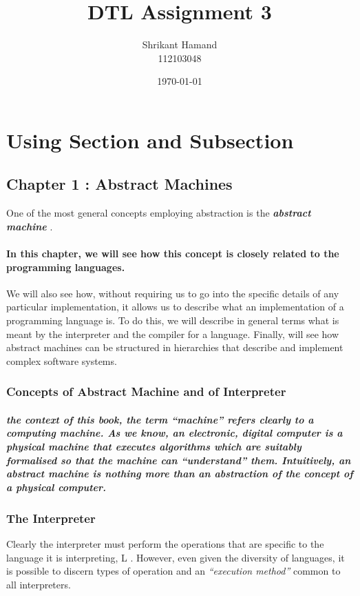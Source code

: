 \documentclass[12pt]{article}
\author{\large Shrikant Hamand \\[10pt] 112103048}
\date{\today}
\begin{document}
\raggedright
\title{\huge \bf DTL Assignment 3}
\maketitle
{}
\newpage
\tableofcontents
\newpage
{}
\section{ Using Section and Subsection}
\vspace{5mm}
\subsection{Chapter 1 : Abstract Machines}
One of the most general concepts employing abstraction is the \textit{\textbf{abstract machine}} .
\paragraph{In this chapter, we will see how this concept is closely related to the programming languages.} We will also see how, without requiring us to go into the specific details of any particular implementation, it allows us to describe what an implementation
of a programming language is. To do this, we will describe in general terms what
is meant by the interpreter and the compiler for a language. Finally, will see how
abstract machines can be structured in hierarchies that describe and implement complex software systems.
\subsubsection{ Concepts of Abstract Machine and of Interpreter}
\subparagraph{ the context of this book, the term \textit{“machine”} refers clearly to a computing machine. As we know, an electronic, digital computer is a physical machine that executes algorithms which are suitably formalised so that the machine can \textit{“understand”} them. Intuitively, an abstract machine is nothing more than an abstraction of the concept of a physical computer.}
\subsubsection{The Interpreter}
Clearly the interpreter must perform the operations that are specific to the language it is interpreting, L . However, even given the diversity of languages, it is possible to discern types of operation and an \textit{“execution method”} common to all interpreters.
\end{document}
